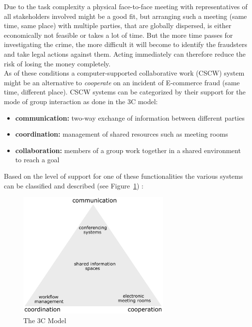 Due to the task complexity a physical face-to-face meeting with representatives of all stakeholders involved might be a good fit, but arranging such a meeting (same time, same place) with multiple parties, that are globally dispersed, is either economically not feasible or takes a lot of time. But the more time passes for investigating the crime, the more difficult it will become to identify the fraudsters and take legal actions against them. Acting immediately can therefore reduce the risk of losing the money completely. \\

As of these conditions a computer-supported collaborative work (\gls{CSCW}) system might be an alternative to \textit{cooperate} on an incident of E-commerce fraud (same time, different place). CSCW systems can be categorized by their support for the mode of group interaction as done in the 3C model: \@

\begin{itemize}
    \item\textbf{communication:} two-way exchange of information between different parties
    \item\textbf{coordination:} management of shared resources such as meeting rooms
    \item\textbf{collaboration:} members of a group work together in a shared environment to reach a goal
\end{itemize}

Based on the level of support for one of these functionalities the various systems can be classified and described (see Figure~\ref{fig:images_3C_model}) \citep{Koch2008}: \@

\begin{figure}[H]
	\centering
		\includegraphics[height=2.5in]{images/3C-model.pdf}
	\caption{The 3C Model \citep{Koch2008}}
\label{fig:images_3C_model}
\end{figure}

